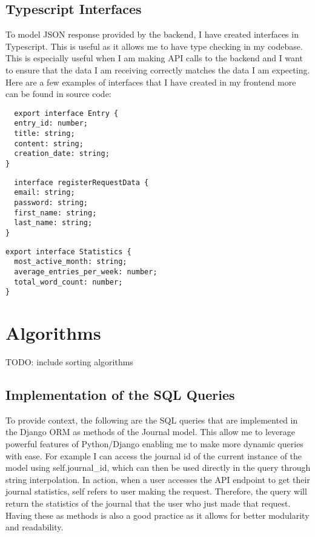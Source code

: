 \subsection{Typescript Interfaces}
To model JSON response provided by the backend, I have created interfaces in Typescript. This is useful as it allows me to have type checking in my codebase. This is especially useful when I am making API calls to the backend and I want to ensure that the data I am receiving correctly matches the data I am expecting. Here are a few examples of interfaces that I have created in my frontend more can be found in source code:

\begin{verbatim}
  export interface Entry {
  entry_id: number;
  title: string;
  content: string;
  creation_date: string;
}
\end{verbatim}
\begin{verbatim}
  interface registerRequestData {
  email: string;
  password: string;
  first_name: string;
  last_name: string;
}
\end{verbatim}

\begin{verbatim}
export interface Statistics {
  most_active_month: string;
  average_entries_per_week: number;
  total_word_count: number;
}
\end{verbatim}



\section{Algorithms}

TODO: include sorting algorithms

\subsection{Implementation of the SQL Queries}
To provide context, the following are the SQL queries that are implemented in the Django ORM as methods of the Journal model. This allow me to leverage powerful features of Python/Django enabling me to make more dynamic queries with ease. For example I can access the journal id of the current instance of the model using self.journal\_id, which can then be used directly in the query through string interpolation. In action, when a user accesses the API endpoint to get their journal statistics, self refers to user making the request. Therefore, the query will return the statistics of the journal that the user who just made that request. Having these as methods is also a good practice as it allows for better modularity and readability.


